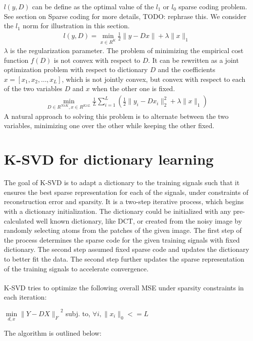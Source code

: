 \documentclass{article} %
\begin{document}
$l(y,D)$ can be define as the optimal value of the $l_1$ or $l_0$ sparse coding problem. See section on Sparse coding for more details, TODO: rephrase this. We consider the $l_1$ norm for illustration in this section.
\begin{align}
l(y, D) = \min_{x \in R^K} \frac{1}{2}\|y - Dx\| + \lambda \|x\|_1
\end{align}
$\lambda$ is the regularization parameter. The problem of minimizing the empirical cost function $f(D)$ is not convex with respect to $D$. It can be rewritten as a joint optimization problem with respect to dictionary $D$ and the coefficients $x = [x_1, x_2, \ldots, x_L]$, which is not jointly convex, but convex with respect to each of the two variables $D$ and $x$ when the other one is fixed.
\begin{align}
\min_{D\in R^{NxK}, x\in R^{KxL}} \frac{1}{L}\sum_{i=1}^{L} \left( \frac{1}{2}\|y_i - Dx_i\|^2_2 + \lambda \|x\|_1 \right)
\end{align} 
A natural approach to solving this problem is to alternate between the two variables, minimizing one over the other while keeping the other fixed. 
 

\section{K-SVD for dictionary learning}

The goal of K-SVD is to adapt a dictionary to the training signals such that it ensures the best sparse representation for each of the signals, under constraints of reconstruction error and sparsity. It is a two-step iterative process, which begins with a dictionary initialization.  The dictionary could be initialized with any pre-calculated well known dictionary, like DCT, or created from the noisy image by randomly selecting atoms from the patches of the given image. 
The first step of the process determines the sparse code for the given training signals with fixed dictionary. The second step assumed fixed sparse code and updates the dictionary to better fit the data. The second step further updates the sparse representation of the training signals to accelerate convergence. \\ \\
K-SVD tries to optimize the following overall MSE under sparsity constraints in each iteration:\\
\begin{center}
$\min\limits_{d,x}{\|Y-DX\|_F}^2$ subj. to, $\forall i, \|x_i\|_0<=L$
\end{center}
The algorithm is outlined below:\\
\end{document}

